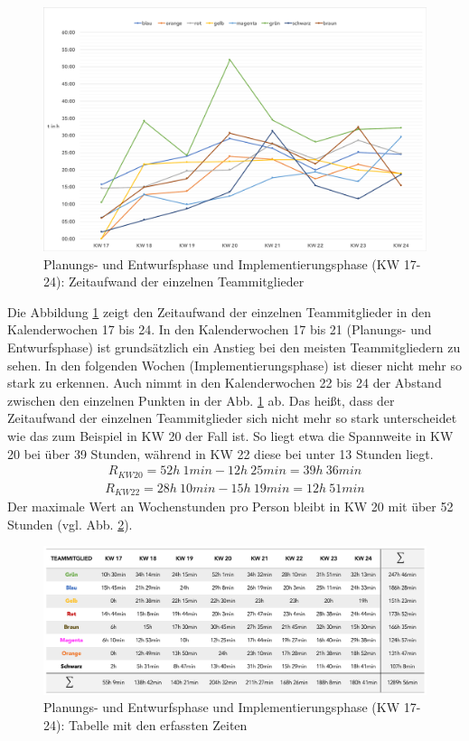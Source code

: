 \documentclass[../review_3.tex]{subfiles}
\begin{document}
\begin{figure} [h]
    \centering
    \includegraphics[width = \linewidth]{img/kimai10.pdf}
    \caption{Planungs- und Entwurfsphase und Implementierungsphase (KW 17-24): Zeitaufwand der einzelnen Teammitglieder}
    \label{kimai10}
\end{figure}

Die Abbildung \ref{kimai10} zeigt den Zeitaufwand der einzelnen Teammitglieder in den Kalenderwochen 17 bis 24. In den Kalenderwochen 17 bis 21 (Planungs- und Entwurfsphase) ist grundsätzlich ein Anstieg bei den meisten Teammitgliedern zu sehen. In den folgenden Wochen (Implementierungsphase) ist dieser nicht mehr so stark zu erkennen. Auch nimmt in den Kalenderwochen 22 bis 24 der Abstand zwischen den einzelnen Punkten in der Abb. \ref{kimai10} ab. Das heißt, dass der Zeitaufwand der einzelnen Teammitglieder sich nicht mehr so stark unterscheidet wie das zum Beispiel in KW 20 der Fall ist. So liegt etwa die Spannweite in KW 20 bei über 39 Stunden, während in KW 22 diese bei unter 13 Stunden liegt.
\begin{align*}
    R_{KW20} = 52h\: 1min - 12h\: 25min = 39h\: 36min
\end{align*}
\begin{align*}
    R_{KW22} = 28h\: 10min - 15h\: 19min = 12h\: 51min
\end{align*}
Der maximale Wert an Wochenstunden pro Person bleibt in KW 20 mit über 52 Stunden (vgl. Abb. \ref{kimai12}).

\begin{figure} [H]
    \centering
    \includegraphics[width = \linewidth]{img/kimai12.png}
    \caption{Planungs- und Entwurfsphase und Implementierungsphase (KW 17-24): Tabelle mit den erfassten Zeiten}
    \label{kimai12}
\end{figure}
\end{document}
